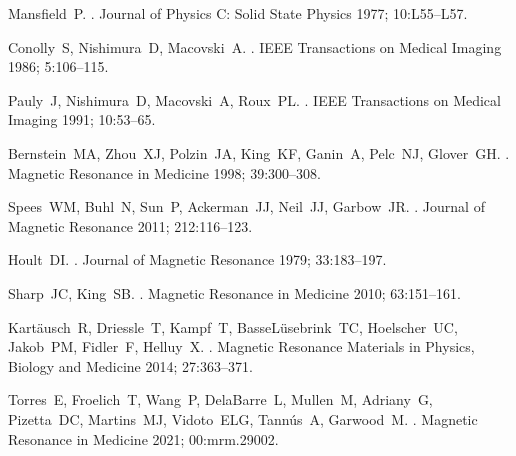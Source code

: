 \documentclass{article}
\begin{document}
% 
% 
\begin{thebibliography}{10}


Mansfield~P.
.
\newblock Journal of Physics C: Solid State Physics 1977; 10:L55--L57.

Conolly~S, Nishimura~D, Macovski~A.
.
\newblock IEEE Transactions on Medical Imaging 1986; 5:106--115.

Pauly~J, Nishimura~D, Macovski~A, Roux~PL.
.
\newblock IEEE Transactions on Medical Imaging 1991; 10:53--65.

Bernstein~MA, Zhou~XJ, Polzin~JA, King~KF, Ganin~A, Pelc~NJ, Glover~GH.
.
\newblock Magnetic Resonance in Medicine 1998; 39:300--308.

Spees~WM, Buhl~N, Sun~P, Ackerman~JJ, Neil~JJ, Garbow~JR.
.
\newblock Journal of Magnetic Resonance 2011; 212:116--123.

Hoult~DI.
.
\newblock Journal of Magnetic Resonance 1979; 33:183--197.

Sharp~JC, King~SB.
.
\newblock Magnetic Resonance in Medicine 2010; 63:151--161.

Kart{\"{a}}usch~R, Driessle~T, Kampf~T, BasseL{\"{u}}sebrink~TC, Hoelscher~UC,
  Jakob~PM, Fidler~F, Helluy~X.
.
\newblock Magnetic Resonance Materials in Physics, Biology and Medicine 2014;
  27:363--371.

Torres~E, Froelich~T, Wang~P, DelaBarre~L, Mullen~M, Adriany~G, Pizetta~DC,
  Martins~MJ, Vidoto~ELG, Tann{\'{u}}s~A, Garwood~M.
.
\newblock Magnetic Resonance in Medicine 2021; 00:mrm.29002.


\end{thebibliography}
\end{document}
